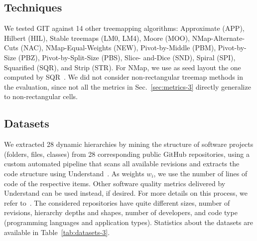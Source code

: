 \subsection{Techniques}
%
We tested GIT against 14 other treemapping algorithms: Approximate (APP), Hilbert (HIL), Stable treemaps (LM0, LM4), Moore (MOO), NMap-Alternate-Cuts (NAC), NMap-Equal-Weights (NEW), Pivot-by-Middle (PBM), Pivot-by-Size (PBZ), Pivot-by-Split-Size (PBS), Slice- and-Dice (SND), Spiral (SPI), Squarified (SQR), and Strip (STR). For NMap, we use as seed layout the one computed by SQR~\cite{nmap}. We did not consider non-rectangular treemap methods in the evaluation, since not all the metrics in Sec.~\ref{sec:metrics-3} directly generalize to non-rectangular cells.

\subsection{Datasets}
%
We extracted 28 dynamic hierarchies by mining the structure of software projects (folders, files, classes) from 28 corresponding public GitHub repositories, using a custom automated pipeline that scans all available revisions and extracts the code structure using Understand~\cite{understand}. As weights $w_i$, we use the number of lines of code of the respective items. Other software quality metrics delivered by Understand can be used instead, if desired. For more details on this process, we refer to~\cite{vmv}. The considered repositories have quite different sizes, number of revisions, hierarchy depths and shapes, number of developers, and code type (programming languages and application types). Statistics about the datasets are available in Table~\ref{tab:datasets-3}.

